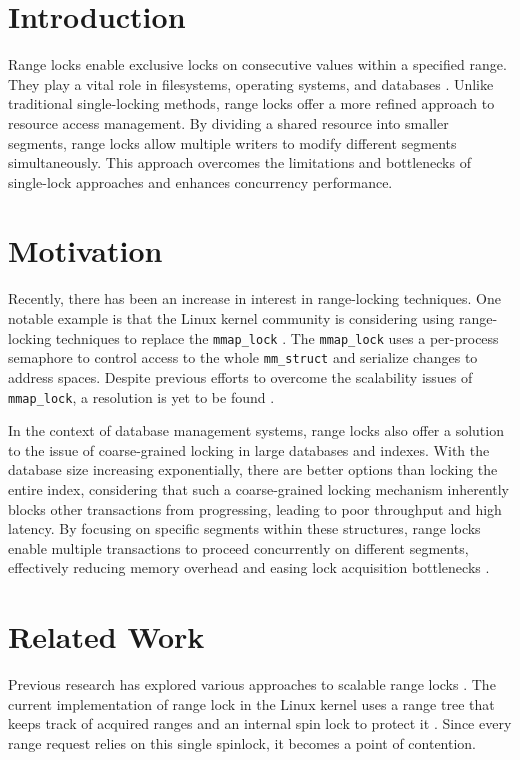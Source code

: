 \section{Introduction}

 Range locks enable exclusive locks on consecutive values within a specified range. They play a vital role in filesystems, operating systems, and databases \parencite{readerWriterLocks2017, graefe2007hierarchical, lee2021concurrent}. Unlike traditional single-locking methods, range locks offer a more refined approach to resource access management. By dividing a shared resource into smaller segments, range locks allow multiple writers to modify different segments simultaneously. This approach overcomes the limitations and bottlenecks of single-lock approaches and enhances concurrency performance.

\section{Motivation}
Recently, there has been an increase in interest in range-locking techniques. One notable example is that the Linux kernel community is considering using range-locking techniques to replace the \texttt{mmap\_lock} \parencite{readerWriterLocks2017, mapleTree2021, mmapLock2022}. The \texttt{mmap\_lock} uses a per-process semaphore to control access to the whole \texttt{mm\_struct} \parencite{mmstruct2023} and serialize changes to address spaces.  Despite previous efforts to overcome the scalability issues of \texttt{mmap\_lock}, a resolution is yet to be found \parencite{mmapLock2022}.

In the context of database management systems, range locks also offer a solution to the issue of coarse-grained locking in large databases and indexes. With the database size increasing exponentially, there are better options than locking the entire index, considering that such a coarse-grained locking mechanism inherently blocks other transactions from progressing, leading to poor throughput and high latency. By focusing on specific segments within these structures, range locks enable multiple transactions to proceed concurrently on different segments, effectively reducing memory overhead and easing lock acquisition bottlenecks \parencite{graefe2007hierarchical}.

\section{Related Work}
Previous research has explored various approaches to scalable range locks \parencite{linuxRangeLockImpl2013, song2013parallelizing, kogan2020scalable}. The current implementation of range lock in the Linux kernel uses a range tree that keeps track of acquired ranges and an internal spin lock to protect it \parencite{linuxRangeLockImpl2013}. Since every range request relies on this single spinlock, it becomes a point of contention. 

